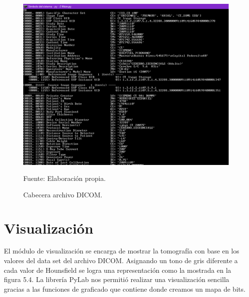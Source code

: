 \documentclass[12pt]{report}
\begin{document}
\begin{figure}[H]
\centering
\includegraphics[width = 12 cm, height = 18 cm]{cabecera}
\caption{Cabecera archivo DICOM.}
Fuente: Elaboración propia.
\end{figure}

\section{Visualización}
El módulo de visualización se encarga de mostrar la tomografía con base en los valores del data set del archivo DICOM. Asignando un tono de gris diferente a cada valor de Hounsfield se logra una representación como la mostrada en la figura 5.4. La librería PyLab nos permitió realizar una visualización sencilla gracias a las funciones de graficado que contiene donde creamos un mapa de bits.
\end{document}
